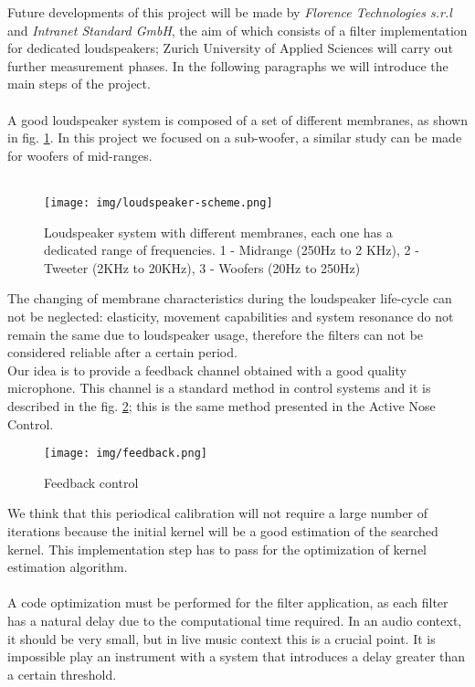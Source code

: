 Future developments of this project will be made by \textit{Florence Technologies s.r.l} and \textit{Intranet Standard GmbH}, the aim of which consists of a filter implementation for dedicated loudspeakers; Zurich University of Applied Sciences will carry out further measurement phases. In the following paragraphs we will introduce the main steps of the project.\\\\
A good loudspeaker system is composed of a set of different membranes, as shown in fig. \ref{fig:loudspekerscheme}. In this project we focused on a sub-woofer, a similar study can be made for woofers of mid-ranges.\\\\
\begin{figure}[h]\centering
\texttt{[image: img/loudspeaker-scheme.png]} 
\caption{Loudspeaker system with different membranes, each one has a dedicated range of frequencies. 1 - Midrange (250Hz to 2 KHz), 2 - Tweeter (2KHz to 20KHz), 3 - Woofers (20Hz to 250Hz)} \label{fig:loudspekerscheme}
\end{figure}
The changing of membrane characteristics during the loudspeaker life-cycle can not be neglected: elasticity, movement capabilities and system resonance do not remain the same due to loudspeaker usage, therefore the filters can not be considered reliable after a certain period.\\
Our idea is to provide a feedback channel obtained with a good quality microphone. This channel is a standard method in control systems and it is described in the fig. \ref{fig:feedbackchannel}; this is the same method presented in the Active Nose Control. \\
\begin{figure}[h]\centering
\texttt{[image: img/feedback.png]} 
\caption{Feedback control}\label{fig:feedbackchannel}
\end{figure}
We think that this periodical calibration will not require a large number of iterations because the initial kernel will be a good estimation of the searched kernel. This implementation step has to pass for the optimization of kernel estimation algorithm.\\\\ 
A code optimization must be performed for the filter application, as each filter has a natural delay due to the computational time required. In an audio context, it should be very small, but in live music context this is a crucial point. It is impossible play an instrument with a system that introduces a delay greater than a certain threshold.\\
